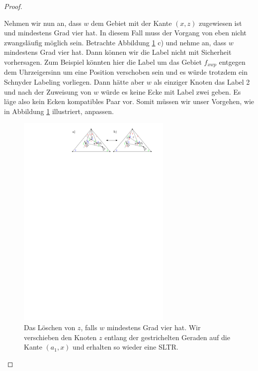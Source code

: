 \begin{proof}
\begin{description}[leftmargin =0pt, font = \bfseries]
Nehmen wir nun an, dass $w$ dem Gebiet mit der Kante $(x,z)$ zugewiesen ist und mindestens Grad vier hat. In diesem Fall muss der Vorgang von eben nicht zwangsläufig möglich sein. Betrachte Abbildung \ref{pic_lem5_6} c) und nehme an, dass $w$ mindestens Grad vier hat. Dann können wir die Label nicht mit Sicherheit vorhersagen. Zum Beispiel könnten hier die Label um das Gebiet $f_{xwp}$ entgegen dem Uhrzeigersinn um eine Position verschoben sein und es würde trotzdem ein Schnyder Labeling vorliegen. Dann hätte aber $w$ als einziger Knoten das Label 2 und nach der Zuweisung von $w$ würde es keine Ecke mit Label zwei geben. Es läge also kein Ecken kompatibles Paar vor. Somit müssen wir unser Vorgehen, wie in Abbildung \ref{pic_lem5_6} illustriert, anpassen.

\begin{figure}[h]
	\centering
	  \includegraphics[width=0.66\textwidth]{lem5_6.pdf}
    	\caption{Das Löschen von $z$, falls $w$ mindestens Grad vier hat. Wir verschieben den Knoten $z$ entlang der gestrichelten Geraden auf die Kante $(a_1,x)$ und erhalten so wieder eine SLTR.}
    	\label{pic_lem5_6}
\end{figure}


\end{description}
\end{proof}
